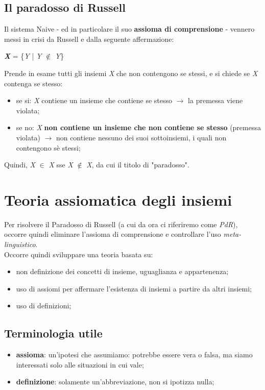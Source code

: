 \documentclass[12pt]{article}
\begin{document}
\subsection{Il paradosso di Russell}
Il sistema Naive - ed in particolare il suo \textbf{assioma di comprensione} - vennero messi in crisi da Russell e dalla seguente affermazione:
\begin{center}
    \textbf{\textit{X}} = \{\textit{Y} | \textit{Y} $\notin$ \textit{Y}\}
\end{center}
Prende in esame tutti gli insiemi \textit{X} che non contengono se stessi, e si chiede se \textit{X} contenga se stesso:
\begin{itemize}
    \item se si: \textit{X} contiene un insieme che contiene se stesso $\rightarrow$ la premessa viene violata;
    \item se no: \textit{X} \textbf{non contiene un insieme che non contiene se stesso} (premessa violata) $\rightarrow$ non contiene nessuno dei suoi sottoinsiemi, i quali non contengono sè stessi;
\end{itemize}
Quindi, \textit{X} $\in$ \textit{X} sse \textit{X} $\notin$ \textit{X}, da cui il titolo di "paradosso".
\section{Teoria assiomatica degli insiemi}
Per risolvere il Paradosso di Russell (a cui da ora ci riferiremo come \textit{PdR}), occorre quindi eliminare l'assioma di comprensione e controllare l'uso \textit{meta-linguistico}.\\
Occorre quindi sviluppare una teoria basata su:
\begin{itemize}
    \item non definizione dei concetti di insieme, uguaglianza e appartenenza;
    \item uso di assiomi per affermare l'esistenza di insiemi a partire da altri insiemi;
    \item uso di definizioni;
\end{itemize}
\subsection{Terminologia utile}
\begin{itemize}
    \item \textbf{assioma}: un'ipotesi che assumiamo: potrebbe essere vera o falsa, ma siamo interessati solo alle situazioni in cui vale;
    \item \textbf{definizione}: solamente un'abbreviazione, non si ipotizza nulla;
\end{itemize}
\pagebreak
\end{document}
